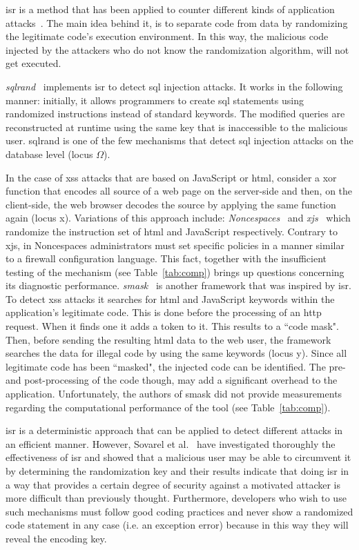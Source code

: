 \documentclass[conference]{IEEEtran}
\begin{document}
{\sc isr} is a method that has been applied to counter
different kinds of application attacks~\cite{K09b,KKP03}.
The main idea behind it, is to separate code from
data by randomizing the legitimate code's 
execution environment. In this way, the malicious code
injected by the attackers who do not know the randomization
algorithm, will not get executed.

{\it {\sc sql}rand}~\cite{BK04} implements {\sc isr}
to detect {\sc sql} injection attacks. It works in the following manner:
initially, it allows programmers to create {\sc sql} statements
using randomized instructions instead of standard keywords.
The modified queries are reconstructed at runtime using
the same key that is inaccessible to the malicious user.
{\sc sql}rand is one of the few mechanisms that
detect {\sc sql} injection attacks on the database
level (locus $\Omega$).

In the case of {\sc xss} attacks that are based on JavaScript
or {\sc html}, consider a {\sc xor} function that encodes all source of a web
page on the server-side and then, on the client-side, the web browser decodes the
source by applying the same function again (locus {\sc x}).
Variations of this approach include:
{\it Noncespaces}~\cite{GC09} and {\it x{\sc js}}~\cite{APKLM10}
which randomize the instruction set of {\sc html} and
JavaScript respectively.
Contrary to x{\sc js}, in Noncespaces administrators must set
specific policies in a manner similar to a firewall
configuration language. This fact, together with the
insufficient testing of the mechanism (see Table~\ref{tab:comp})
brings up questions concerning its diagnostic performance.
{\it {\sc sm}ask}~\cite{JB07} is another framework
that was inspired by {\sc isr}. To detect {\sc xss}
attacks it searches for {\sc html} and JavaScript
keywords within the application's legitimate code.
This is done before the processing of an {\sc http}
request. When it finds one it adds a token to it.
This results to a ``code mask". Then,
before sending the resulting {\sc html} data to the
web user, the framework searches the data for
illegal code by using the same keywords (locus {\sc y}).
Since all legitimate code has been ``masked",
the injected code can be identified.
The pre- and post-processing of the code though,
may add a significant overhead to the application.
Unfortunately, the authors of {\sc sm}ask
did not provide measurements regarding the
computational performance of the tool (see Table~\ref{tab:comp}).

{\sc isr} is a deterministic approach that can be applied
to detect different attacks in an efficient manner.
However, Sovarel et al.~\cite{SEP05}
have investigated thoroughly the effectiveness
of {\sc isr} and showed that a malicious user
may be able to circumvent it by determining
the randomization key and their results
indicate that doing {\sc isr} in a way that
provides a certain degree of security against a motivated
attacker is more difficult than previously thought.
Furthermore, developers who wish to use
such mechanisms must follow good coding practices
and never show a randomized code statement in any case
(i.e. an exception error) because in this way
they will reveal the encoding key.
\end{document}

